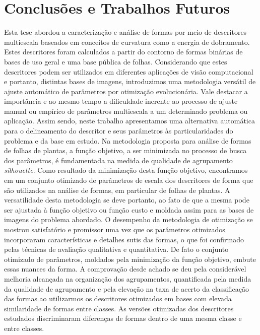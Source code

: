 \chapter{Conclusões e Trabalhos Futuros \label{chap:ch5}}

Esta tese abordou a caracterização e análise de formas por meio de descritores multiescala baseados em conceitos de curvatura como a energia de dobramento. Estes descritores foram calculados a partir do contorno de formas binárias de bases de uso geral e uma base pública de folhas. Considerando que estes descritores podem ser utilizados em diferentes aplicações de visão computacional e portanto, distintas bases de imagens, introduzimos uma metodologia versátil de ajuste automático de parâmetros por otimização evolucionária. Vale destacar a importância e ao mesmo tempo a dificuldade inerente ao processo de ajuste manual ou empírico de parâmetros multiescala a um determinado problema ou aplicação. Assim sendo, neste trabalho apresentamos uma alternativa automática para o delineamento do descritor e seus parâmetros às particularidades do problema  e da base em estudo.  
Na metodologia proposta para análise de formas de folhas de plantas, a função objetivo, a ser minimizada no processo de busca dos parâmetros, é fundamentada na medida de qualidade de agrupamento \textit{silhouette}. Como resultado da minimização desta função objetivo, encontramos em um conjunto otimizado de parâmetros de escala dos descritores de forma que são utilizados na análise de formas, em particular de folhas de plantas.  A versatilidade desta metodologia se deve portanto, ao fato de que a mesma pode ser ajustada à função  objetivo ou função custo e moldada assim para as bases de imagens do problema abordado.
O desempenho da metodologia de otimização se mostrou satisfatório e promissor uma vez que os parâmetros otimizados incorporaram características e detalhes sutis das formas, o que foi confirmado pelas técnicas de avaliação qualitativa e quantitativa. De fato o conjunto otimizado de parâmetros, moldados pela minimização da função objetivo,  embute essas nuances da forma. A comprovação desde achado se deu pela considerável melhoria alcançada na organização dos agrupamentos, quantificada pela medida da qualidade de agrupamento e pela elevação na taxa de acerto da classificação das formas ao utilizarmos os descritores otimizados em bases com elevada similaridade de formas entre classes. As versões otimizadas dos descritores estudados discriminaram diferenças de formas dentro de uma mesma classe e entre classes.  
